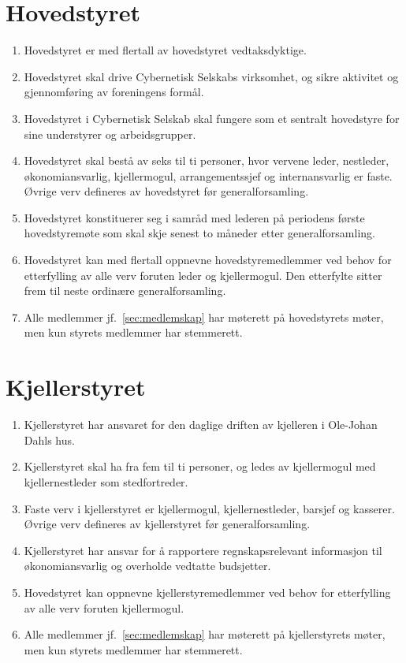 \documentclass[8pt,norsk,a4paper]{article}
\begin{document}
\section{Hovedstyret}
\begin{enumerate}
	\item{Hovedstyret er med  flertall av hovedstyret vedtaksdyktige.}
	\item{Hovedstyret skal drive Cybernetisk Selskabs virksomhet, og sikre aktivitet og gjennomføring av foreningens formål.}
	\item{Hovedstyret i Cybernetisk Selskab skal fungere som et sentralt hovedstyre for sine understyrer og arbeidsgrupper.}
	\item{Hovedstyret skal bestå av seks til ti personer, hvor vervene leder, nestleder, økonomiansvarlig, kjellermogul, arrangementssjef og internansvarlig er faste. Øvrige verv defineres av hovedstyret før generalforsamling.\label{sec:hs-antall}}
	\item{Hovedstyret konstituerer seg i samråd med lederen på periodens første hovedstyremøte som skal skje senest to måneder etter generalforsamling.}
	\item{\label{item:etterfylling-hs}Hovedstyret kan med  flertall oppnevne hovedstyremedlemmer ved behov for etterfylling av alle verv foruten leder og kjellermogul. Den etterfylte sitter frem til neste ordinære generalforsamling.} 
	\item{Alle medlemmer jf.~\ref{sec:medlemskap} har møterett på hovedstyrets møter, men kun styrets medlemmer har stemmerett.}
\end{enumerate}

\section{Kjellerstyret}
\begin{enumerate}
	\item{Kjellerstyret har ansvaret for den daglige driften av kjelleren i Ole-Johan Dahls hus.}
	\item{Kjellerstyret skal ha fra fem til ti personer, og ledes av kjellermogul med kjellernestleder som stedfortreder.}
	\item{Faste verv i kjellerstyret er kjellermogul, kjellernestleder, barsjef og kasserer. Øvrige verv defineres av kjellerstyret før generalforsamling.}
	\item{Kjellerstyret har ansvar for å rapportere regnskapsrelevant informasjon til økonomiansvarlig og overholde vedtatte budsjetter.}
	\item{\label{item:etterfylling-ks}Hovedstyret kan oppnevne kjellerstyremedlemmer ved behov for etterfylling av alle verv foruten kjellermogul.}
 	\item{Alle medlemmer jf.~\ref{sec:medlemskap} har møterett på kjellerstyrets møter, men kun styrets medlemmer har stemmerett.}
\end{enumerate}
\end{document}
